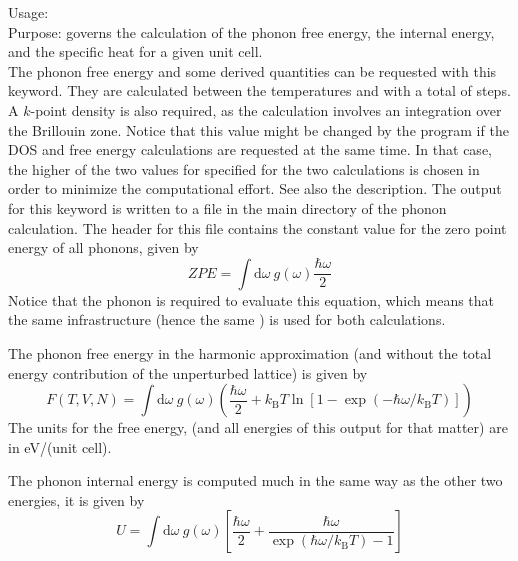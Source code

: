 { Usage:   \\[1.0em]
  Purpose: governs the calculation of the phonon free energy, the
  internal energy, and the specific heat for a given unit cell. \\ } 
The phonon free energy and some derived quantities can be requested
with this keyword. They are 
calculated between the temperatures  and 
with a total of  steps. A $k$-point density  is
also required, as the calculation involves an integration over the
Brillouin zone. Notice that this value might be changed by the program
if the DOS and free energy calculations are requested at the same
time. In that case, the higher of the two values for 
specified for the two calculations is chosen in order to minimize the
computational effort. See also the 
description. The output for this keyword is written to a file
 in the main directory of the
phonon calculation. The header for this file contains the constant
value for the zero point energy of all phonons, given by
\begin{equation}
ZPE = \int \mathrm{d}\omega\ g(\omega) \frac{\hbar\omega}{2}
\end{equation}
Notice that the phonon  is required to evaluate this
equation, which means that the same infrastructure (hence the same
) is used for both calculations. 

The phonon free energy in the harmonic approximation (and without the
total energy contribution of the unperturbed lattice) is given by 
\begin{equation}
F(T,V,N) =  \int \mathrm{d}\omega\ g(\omega) \left( \frac{\hbar\omega}{2}+
k_\mathrm{B}T \ln [1-\exp(-\hbar\omega/k_\mathrm{B}T)] \right)
\end{equation}
The units for the free energy, (and all energies of this output for
that matter) are in eV/(unit cell). 

The phonon internal energy is computed much in the same way as the other two
energies, it is given by
\begin{equation}
U =  \int \mathrm{d}\omega\ g(\omega) \left[ \frac{\hbar\omega}{2}+
\frac{\hbar\omega}{\exp(\hbar\omega/k_\mathrm{B}T)-1} \right]
\end{equation}

